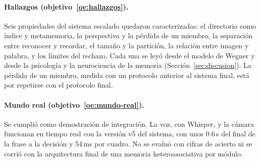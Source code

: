 \paragraph{Hallazgos (objetivo~\ref{oe:hallazgos}).}
Seis propiedades del sistema escalado quedaron caracterizadas: el directorio como índice y
metamemoria, la perspectiva y la pérdida de un miembro, la separación entre reconocer y
recordar, el tamaño y la partición, la relación entre imagen y palabra, y los límites del
rechazo.
Cada una se leyó desde el modelo de Wegner y desde la psicología y la neurociencia de la
memoria (Sección~\ref{sec:discusion}).
La pérdida de un miembro, medida con un protocolo anterior al sistema final, está por
repetirse con el protocolo final.

\paragraph{Mundo real (objetivo~\ref{oe:mundo-real}).}
Se cumplió como demostración de integración.
La voz, con Whisper, y la cámara funcionan en tiempo real con la versión v5 del sistema,
con unos 0.6\,s del final de la frase a la decisión y 54\,ms por cuadro.
No se evaluó con cifras de acierto ni se corrió con la arquitectura final de una memoria
heteroasociativa por módulo.
